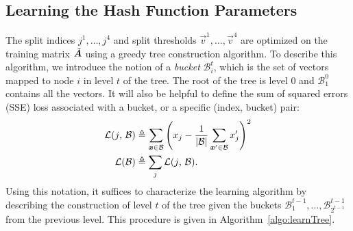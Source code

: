\vspace{-2mm}
\subsection{Learning the Hash Function Parameters}

The split indices ${j^1,\ldots,j^4}$ and split thresholds $\vec{v}^1,\ldots,\vec{v}^4$ are optimized on the training matrix $\tilde{\bm{A}}$ using a greedy tree construction algorithm.
To describe this algorithm, we introduce the notion of a \textit{bucket} $\mathcal{B}^t_i$, which is the set of vectors mapped to node $i$ in level $t$ of the tree. The root of the tree is level 0 and $\mathcal{B}^0_1$ contains all the vectors. It will also be helpful to define the sum of squared errors (SSE) loss associated with a bucket, or a specific (index, bucket) pair:
\begin{align}
    \mathcal{L}(j \text{, } \mathcal{B}) &\triangleq \sum_{\bm{x} \in \mathcal{B}} \left( x_j - \frac{1}{|\mathcal{B}|}\sum_{\bm{x}^\prime \in \mathcal{B}} x^\prime_j \right)^2  \\
    \mathcal{L}(\mathcal{B}) &\triangleq \sum_j \mathcal{L}(j \text{, } \mathcal{B}).
\end{align}
Using this notation, it suffices to characterize the learning algorithm by describing the construction of level $t$ of the tree given the buckets $\mathcal{B}^{t-1}_1,\ldots,\mathcal{B}^{t-1}_{2^{t-1}}$ from the previous level. This procedure is given in Algorithm~\ref{algo:learnTree}.

